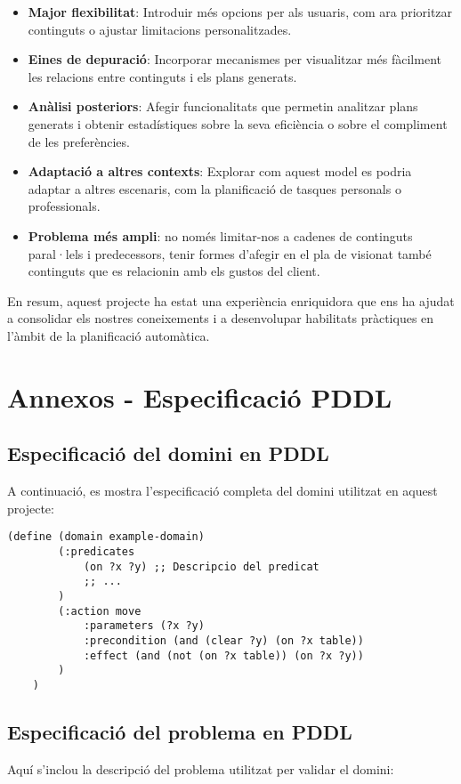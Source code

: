 \documentclass[a4paper]{article}
\begin{document}
	\begin{itemize}
		\item \textbf{Major flexibilitat}: Introduir més opcions per als usuaris, com ara prioritzar continguts o ajustar limitacions personalitzades.
		\item \textbf{Eines de depuració}: Incorporar mecanismes per visualitzar més fàcilment les relacions entre continguts i els plans generats.
		\item \textbf{Anàlisi posteriors}: Afegir funcionalitats que permetin analitzar plans generats i obtenir estadístiques sobre la seva eficiència o sobre el compliment de les preferències.
		\item \textbf{Adaptació a altres contexts}: Explorar com aquest model es podria adaptar a altres escenaris, com la planificació de tasques personals o professionals.
		\item \textbf{Problema més ampli}: no només limitar-nos a cadenes de continguts paral·lels i predecessors, tenir formes d'afegir en el pla de visionat també continguts que es relacionin amb els gustos del client.
	\end{itemize}
	
	En resum, aquest projecte ha estat una experiència enriquidora que ens ha ajudat a consolidar els nostres coneixements i a desenvolupar habilitats pràctiques en l'àmbit de la planificació automàtica.	
	
	\newpage
	\appendix
	\section{Annexos - Especificació PDDL}
	
	\subsection{Especificació del domini en PDDL}
	
	A continuació, es mostra l'especificació completa del domini utilitzat en aquest projecte:
	
	\begin{lstlisting}[language=PDDL, caption={Especificació del domini en PDDL}, label={lst:dominiPDDL}]
	(define (domain example-domain)
		(:predicates
			(on ?x ?y) ;; Descripcio del predicat
			;; ...
		)
		(:action move
			:parameters (?x ?y)
			:precondition (and (clear ?y) (on ?x table))
			:effect (and (not (on ?x table)) (on ?x ?y))
		)
	)
	\end{lstlisting}
	
	\subsection{Especificació del problema en PDDL}
	Aquí s'inclou la descripció del problema utilitzat per validar el domini:
	
\end{document}
